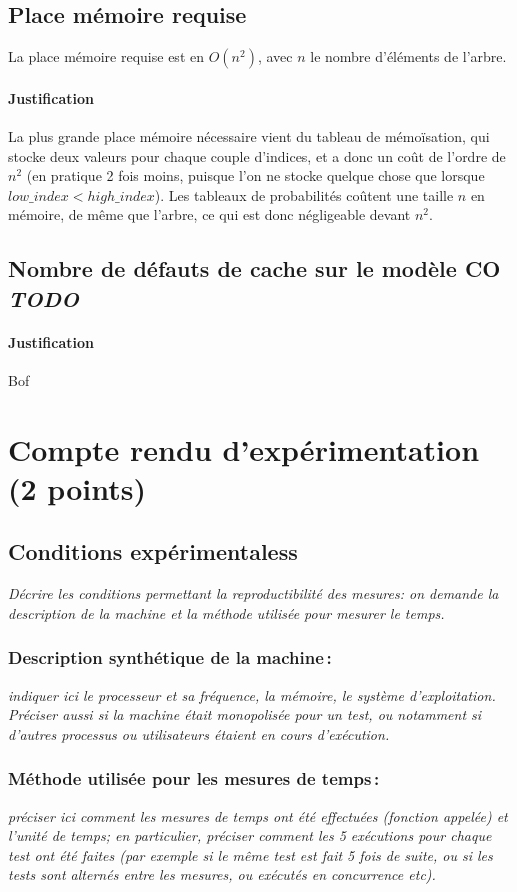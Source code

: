 \documentclass[a4paper, 10pt, french]{article}
\begin{document}
  \subsection{Place mémoire requise}
  La place mémoire requise est en $O(n^2)$, avec $n$ le nombre d'éléments de l'arbre.
	\paragraph{Justification}
	La plus grande place mémoire nécessaire vient du tableau de mémoïsation, qui stocke deux valeurs pour chaque couple d'indices, et a donc un coût de l'ordre de $n^2$ (en pratique 2 fois moins, puisque l'on ne stocke quelque chose que lorsque $low\_index < high\_index$).
	Les tableaux de probabilités coûtent une taille $n$ en mémoire, de même que l'arbre, ce qui est donc négligeable devant $n^2$.

  \subsection{Nombre de défauts de cache sur le modèle CO \em TODO}
	\paragraph{Justification}
	Bof

\section{Compte rendu d'expérimentation (2 points)}
  \subsection{Conditions expérimentaless}
	 {\em Décrire les conditions permettant la reproductibilité des mesures: on demande la description
	  de la machine et la méthode utilisée pour mesurer le temps.
	 }

	\subsubsection{Description synthétique de la machine\,:} 
	  {\em indiquer ici le  processeur et sa fréquence, la mémoire, le système d'exploitation. 
	   Préciser aussi si la machine était monopolisée pour un test, ou notamment si 
	   d'autres processus ou utilisateurs étaient en cours d'exécution. 
	  } 

	\subsubsection{Méthode utilisée pour les mesures de temps\,: } 
	  {\em préciser ici  comment les mesures de temps ont été effectuées (fonction appelée) et l'unité de temps; en particulier, 
	   préciser comment les 5 exécutions pour chaque test ont été faites (par exemple si le même test est fait 5 fois de suite, ou si les tests sont alternés entre
	   les mesures, ou exécutés en concurrence etc). 
	  }
\end{document}
